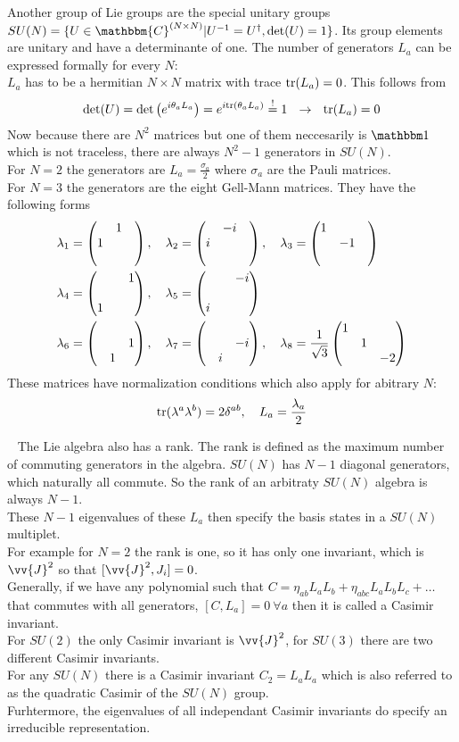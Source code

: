 Another group of Lie groups are the special unitary groups $SU(N) = \{ U \in\mathbbm{C}^{(N\times N)} | U^{-1} = U^\dagger, \det(U) = 1\}$. Its group elements are unitary and have a determinante of one. The number of generators $L_a$ can be expressed formally for every $N$:\\
$L_a$ has to be a hermitian $N\times N$ matrix with trace ${\rm tr}(L_a) = 0$. This follows from
\[ \det(U) = \det \left( e^{i \theta_a L_a}\right) = e^{i {\rm tr}(\theta_a L_a)} \overset{!}{=} 1 ~~\rightarrow ~~ {\rm tr}(L_a) = 0\]
Now because there are $N^2$ matrices but one of them neccesarily is $\ehm$ which is not traceless, there are always $N^2-1$ generators in $SU(N)$.\\
For $N = 2$ the generators are $L_a = \frac{\sigma_a}{2}$ where $\sigma_a$ are the Pauli matrices.\\
For $N = 3$ the generators are the eight Gell-Mann matrices. They have the following forms
\begin{align*} \lambda_1 &= \begin{pmatrix}&1&\\1&&\\&&\end{pmatrix},~~~\lambda_2 = \begin{pmatrix}&-i&\\i&&\\&&\end{pmatrix},~~~\lambda_3 = \begin{pmatrix}1&&\\&-1&\\&&\end{pmatrix}\\
\lambda_4 &= \begin{pmatrix}&&1\\&&\\1&&\end{pmatrix}, ~~~\lambda_5 = \begin{pmatrix}&&-i\\&&\\i&&\end{pmatrix}\\
\lambda_6 &= \begin{pmatrix}&&\\&&1\\&1&\end{pmatrix}, ~~~\lambda_7 = \begin{pmatrix}&&\\&&-i\\&i&\end{pmatrix}, ~~~\lambda_8 = \frac{1}{\sqrt{3}} \begin{pmatrix}1&&\\&1&\\&&-2\end{pmatrix}
\end{align*}
These matrices have normalization conditions which also apply for abitrary $N$:
\[ {\rm tr}(\lambda^a \lambda^b) = 2\delta^{ab}, ~~~ L_a = \frac{\lambda_a}{2}\]


~\newline\newline{}
The Lie algebra also has a rank. The rank is defined as the maximum number of commuting generators in the algebra. $SU(N)$ has $N-1$ diagonal generators, which naturally all commute. So the rank of an arbitraty $SU(N)$ algebra is always $N-1$.\\
These $N-1$ eigenvalues of these $L_a$ then specify the basis states in a $SU(N)$ multiplet.\\
For example for $N = 2$ the rank is one, so it has only one invariant, which is $\vv{J}^2$ so that $[\vv{J}^2, J_i] = 0$.\\
Generally, if we have any polynomial such that $C = \eta_{ab} L_a L_b + \eta_{abc} L_aL_bL_c + \ldots$ that commutes with all generators, $[C,L_a] = 0 ~\forall a$ then it is called a Casimir invariant.\\
For $SU(2)$ the only Casimir invariant is $\vv{J}^2$, for $SU(3)$ there are two different Casimir invariants.\\
For any $SU(N)$ there is a Casimir invariant $C_2 = L_aL_a$ which is also referred to as the quadratic Casimir of the $SU(N)$ group.\\
Furhtermore, the eigenvalues of all independant Casimir invariants do specify an irreducible representation.


